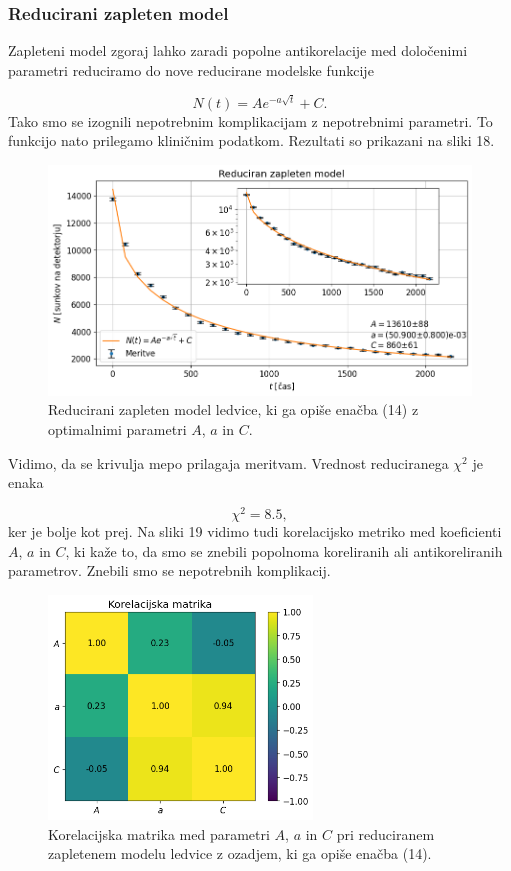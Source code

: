 \documentclass[slovene,11pt,a4paper]{article}
\begin{document}
\subsubsection{Reducirani zapleten model}

Zapleteni model zgoraj lahko zaradi popolne antikorelacije med določenimi parametri reduciramo do nove reducirane modelske funkcije

\begin{equation}
N(t) = Ae^{-a\sqrt{t}} + C.
\end{equation}
Tako smo se izognili nepotrebnim komplikacijam z nepotrebnimi parametri. To funkcijo nato prilegamo kliničnim podatkom. Rezultati so prikazani na sliki 18.

\begin{figure}[h!]
\centering
\includegraphics[width=13cm]{ledvice12.png}
\caption{Reducirani zapleten model ledvice, ki ga opiše enačba (14) z optimalnimi parametri $A$, $a$ in $C$.}
\end{figure}
Vidimo, da se krivulja mepo prilagaja meritvam. Vrednost reduciranega $\chi^2$ je enaka

\[
\chi^2 = 8.5,
\]
ker je bolje kot prej. Na sliki 19 vidimo tudi korelacijsko metriko med koeficienti $A$, $a$ in $C$, ki kaže to, da smo se znebili popolnoma koreliranih ali antikoreliranih parametrov. Znebili smo se nepotrebnih komplikacij.

\newpage

\begin{figure}[h!]
\centering
\includegraphics[width=7cm]{ledvice13.png}
\caption{Korelacijska matrika med parametri $A$, $a$ in $C$ pri reduciranem zapletenem modelu ledvice z ozadjem, ki ga opiše enačba (14).}
\end{figure}
\end{document}
